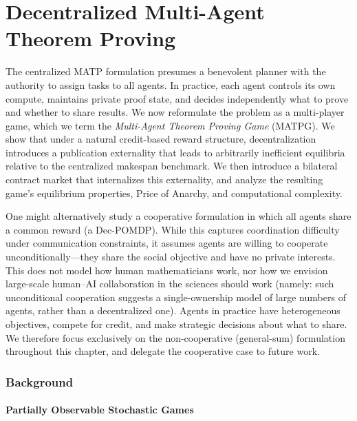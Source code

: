 \chapter{Decentralized Multi-Agent Theorem Proving}\label{sec:decentralized}

The centralized MATP formulation presumes a benevolent planner with the authority to assign tasks to all agents. In practice, each agent controls its own compute, maintains private proof state, and decides independently what to prove and whether to share results. We now reformulate the problem as a multi-player game, which we term the \emph{Multi-Agent Theorem Proving Game} (MATPG). We show that under a natural credit-based reward structure, decentralization introduces a publication externality that leads to arbitrarily inefficient equilibria relative to the centralized makespan benchmark. We then introduce a bilateral contract market that internalizes this externality, and analyze the resulting game's equilibrium properties, Price of Anarchy, and computational complexity.

\begin{remark}[Scope]
One might alternatively study a cooperative formulation in which all agents share a common reward (a Dec-POMDP). While this captures coordination difficulty under communication constraints, it assumes agents are willing to cooperate unconditionally---they share the social objective and have no private interests. This does not model how human mathematicians work, nor how we envision large-scale human--AI collaboration in the sciences should work (namely: such unconditional cooperation suggests a single-ownership model of large numbers of agents, rather than a decentralized one). Agents in practice have heterogeneous objectives, compete for credit, and make strategic decisions about what to share. We therefore focus exclusively on the non-cooperative (general-sum) formulation throughout this chapter, and delegate the cooperative case to future work.
\end{remark}


\subsection{Background}\label{sec:posg-background}

\subsubsection{Partially Observable Stochastic Games}

